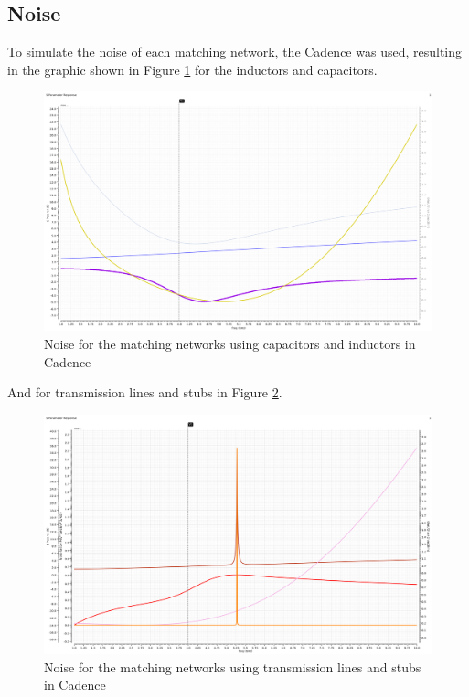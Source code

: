 
\subsection{Noise}

To simulate the noise of each matching network, the Cadence was used, resulting in the graphic shown in Figure \ref{fig:NoiseLC} for the inductors and capacitors.

\begin{figure}[H]
    \centering
    \includegraphics*[scale = 0.3]{Images/noiseLC.png}
    \caption{Noise for the matching networks using capacitors and inductors in Cadence}
    \label{fig:NoiseLC}
\end{figure}

And for transmission lines and stubs in Figure \ref{fig:NoiseLS}.

\begin{figure}[H]
    \centering
    \includegraphics*[scale = 0.3]{Images/noiseLS.png}
    \caption{Noise for the matching networks using transmission lines and stubs in Cadence}
    \label{fig:NoiseLS}
\end{figure}

